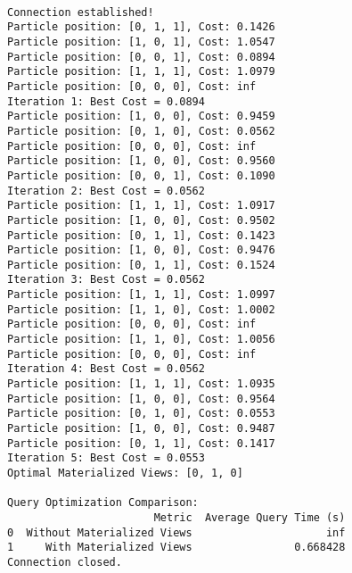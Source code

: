 \begin{lstlisting}[style=pythonstyle, label={lst:example} caption={Python Code Example}]

Connection established!
Particle position: [0, 1, 1], Cost: 0.1426
Particle position: [1, 0, 1], Cost: 1.0547
Particle position: [0, 0, 1], Cost: 0.0894
Particle position: [1, 1, 1], Cost: 1.0979
Particle position: [0, 0, 0], Cost: inf
Iteration 1: Best Cost = 0.0894
Particle position: [1, 0, 0], Cost: 0.9459
Particle position: [0, 1, 0], Cost: 0.0562
Particle position: [0, 0, 0], Cost: inf
Particle position: [1, 0, 0], Cost: 0.9560
Particle position: [0, 0, 1], Cost: 0.1090
Iteration 2: Best Cost = 0.0562
Particle position: [1, 1, 1], Cost: 1.0917
Particle position: [1, 0, 0], Cost: 0.9502
Particle position: [0, 1, 1], Cost: 0.1423
Particle position: [1, 0, 0], Cost: 0.9476
Particle position: [0, 1, 1], Cost: 0.1524
Iteration 3: Best Cost = 0.0562
Particle position: [1, 1, 1], Cost: 1.0997
Particle position: [1, 1, 0], Cost: 1.0002
Particle position: [0, 0, 0], Cost: inf
Particle position: [1, 1, 0], Cost: 1.0056
Particle position: [0, 0, 0], Cost: inf
Iteration 4: Best Cost = 0.0562
Particle position: [1, 1, 1], Cost: 1.0935
Particle position: [1, 0, 0], Cost: 0.9564
Particle position: [0, 1, 0], Cost: 0.0553
Particle position: [1, 0, 0], Cost: 0.9487
Particle position: [0, 1, 1], Cost: 0.1417
Iteration 5: Best Cost = 0.0553
Optimal Materialized Views: [0, 1, 0]

Query Optimization Comparison:
                       Metric  Average Query Time (s)
0  Without Materialized Views                     inf
1     With Materialized Views                0.668428
Connection closed.


\end{lstlisting}